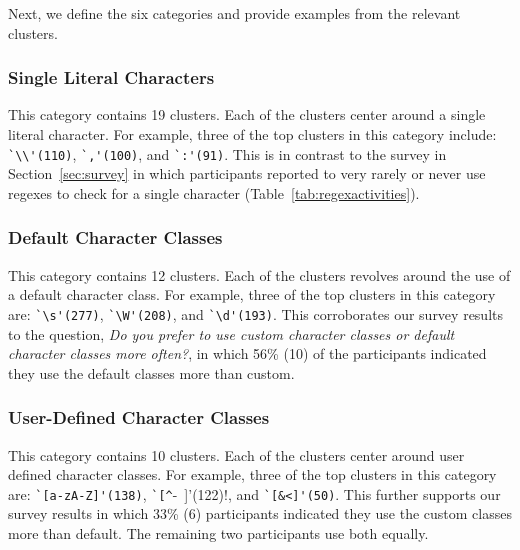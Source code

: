 Next, we define the six categories and provide examples from the relevant clusters.

\subsubsection{Single Literal Characters}
This category contains 19 clusters. Each of the clusters center around a single literal character. For example, three of the top clusters in this category include:
\verb!`\\'(110)!, \verb!`,'(100)!, and \verb!`:'(91)!. This is in contrast to the survey in Section~\ref{sec:survey} in which participants reported to very rarely or never use regexes to check for a single character (Table~\ref{tab:regexactivities}).

\subsubsection{Default Character Classes}
This category contains 12 clusters. Each of the clusters revolves around the use of a default character class. For example, three of the top clusters in this category are:
\verb!`\s'(277)!, \verb!`\W'(208)!, and \verb!`\d'(193)!. This corroborates our survey results to the question, \emph{Do you prefer to use custom character classes or default character classes more often?}, in which 56\% (10) of the participants indicated they use the default classes more than custom.

\subsubsection{User-Defined Character Classes}
This category contains 10 clusters. Each of the clusters center around user defined character classes. For example, three of the top clusters in this category are:
\verb!`[a-zA-Z]'(138)!, \verb!`[^!-~]'(122)!, and \verb!`[&<]'(50)!. This further supports our survey results in which 33\% (6) participants indicated they use the custom classes more than default. The remaining two participants use both equally.


